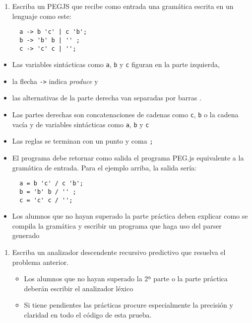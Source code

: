 \begin{enumerate}
\def\labelenumi{\arabic{enumi}.}
\item
  Escriba un PEGJS que recibe como entrada una gramática escrita en un
  lenguaje como este:

\begin{verbatim}
  a -> b 'c' | c 'b';
  b -> 'b' b | '' ;
  c -> 'c' c | '';
\end{verbatim}
\end{enumerate}

\begin{itemize}
\item
  Las variables sintácticas como \texttt{a}, \texttt{b} y \texttt{c}
  figuran en la parte izquierda,
\item
  la flecha \texttt{-\textgreater{}} indica \emph{produce} y
\item
  las alternativas de la parte derecha van separadas por barras
  \texttt{\textbar{}}.
\item
  Las partes derechas son concatenaciones de cadenas como
  \texttt{\textquotesingle{}c\textquotesingle{}},
  \texttt{\textquotesingle{}b\textquotesingle{}} o la cadena vacía
  \texttt{\textquotesingle{}\textquotesingle{}} y de variables
  sintácticas como \texttt{a}, \texttt{b} y \texttt{c}
\item
  Las reglas se terminan con un punto y coma \texttt{;}
\item
  El programa debe retornar como salida el programa PEG.js equivalente a
  la gramática de entrada. Para el ejemplo arriba, la salida sería:

\begin{verbatim}
  a = b 'c' / c 'b';
  b = 'b' b / '' ;
  c = 'c' c / '';
\end{verbatim}
\item
  Los alumnos que no hayan superado la parte práctica deben explicar
  como se compila la gramática y escribir un programa que haga uso del
  parser generado
\end{itemize}

\begin{enumerate}
\def\labelenumi{\arabic{enumi}.}
\setcounter{enumi}{1}
\itemsep1pt\parskip0pt
\item
  Escriba un analizador descendente recursivo predictivo que resuelva el
  problema anterior.

  \begin{itemize}
  \itemsep1pt\parskip0pt
  \item
    Los alumnos que no hayan superado la 2ª parte o la parte práctica
    deberán escribir el analizador léxico
  \item
    Si tiene pendientes las prácticas procure especialmente la precisión
    y claridad en todo el código de esta prueba.
  \end{itemize}
\end{enumerate}
